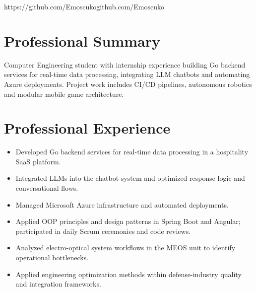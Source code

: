 \documentclass[10pt,a4paper]{article}
\begin{document}
  {https://github.com/Emoscuko}{github.com/Emoscuko}

\section{Professional Summary}
Computer Engineering student with internship experience building Go backend services for
real-time data processing, integrating LLM chatbots and automating Azure deployments.
Project work includes CI/CD pipelines, autonomous robotics and modular mobile game architecture.

\section{Professional Experience}
\begin{itemize}
  \item Developed Go backend services for real-time data processing in a hospitality SaaS platform.
  \item Integrated LLMs into the chatbot system and optimized response logic and conversational flows.
  \item Managed Microsoft Azure infrastructure and automated deployments.
  \item Applied OOP principles and design patterns in Spring Boot and Angular; participated in
        daily Scrum ceremonies and code reviews.
\end{itemize}

\begin{itemize}
  \item Analyzed electro-optical system workflows in the MEOS unit to identify operational bottlenecks.
  \item Applied engineering optimization methods within defense-industry quality and integration frameworks.
\end{itemize}
\end{document}
